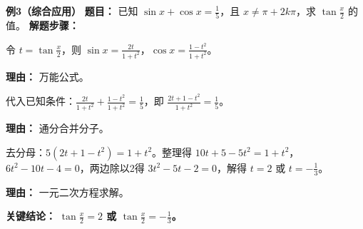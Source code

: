 \begin{examplebox}
	\medskip
	\textbf{\textcolor{CExample}{例3（综合应用）}}
	\textbf{\textcolor{CExample}{题目：}}
	已知 $\sin x + \cos x = \frac{1}{5}$，且 $x\neq \pi+2k\pi$，求 $\tan\frac{x}{2}$ 的值。
	\textbf{\textcolor{CExample}{解题步骤：}}
	\begin{description}[style=nextline, leftmargin=2.8em, labelsep=0.5em, itemsep=0.45em]
		\item[\textbf{第一步（代换化归）：}]
			令 $t = \tan\frac{x}{2}$，则 $\sin x = \frac{2t}{1+t^2}$，$\cos x = \frac{1-t^2}{1+t^2}$。
			\par\textbf{理由：} 万能公式。
		\item[\textbf{第二步（列方程）：}]
			代入已知条件：$\frac{2t}{1+t^2} + \frac{1-t^2}{1+t^2} = \frac{1}{5}$，即 $\frac{2t+1-t^2}{1+t^2} = \frac{1}{5}$。
			\par\textbf{理由：} 通分合并分子。
		\item[\textbf{第三步（解方程得t）：}]
			去分母：$5(2t+1-t^2) = 1+t^2$。整理得 $10t+5-5t^2 = 1+t^2$，$6t^2 -10t -4 = 0$，两边除以2得 $3t^2 -5t -2 = 0$，解得 $t=2$ 或 $t=-\frac{1}{3}$。
			\par\textbf{理由：} 一元二次方程求解。
	\end{description}
	\textbf{\textcolor{CExample}{关键结论：}}
	\textbf{$\tan\frac{x}{2}=2$ 或 $\tan\frac{x}{2}=-\frac{1}{3}$。}
\end{examplebox}
